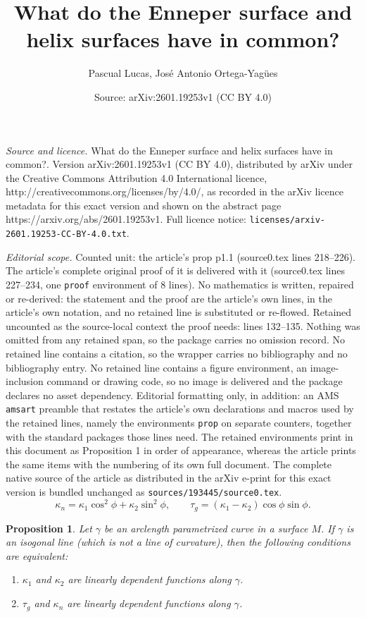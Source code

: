 \documentclass[10pt,a4paper]{amsart}
\title{What do the Enneper surface and helix surfaces have in common?}
\author{Pascual Lucas, Jos\'e Antonio Ortega-Yag\"ues}
\date{Source: arXiv:2601.19253v1 (CC BY 4.0)}
\newtheorem{prop}{Proposition}
\begin{document}
\maketitle

\noindent\emph{Source and licence.} What do the Enneper surface and helix surfaces have in common?. Version arXiv:2601.19253v1 (CC BY 4.0), distributed by arXiv under the Creative Commons Attribution 4.0 International licence, http://creativecommons.org/licenses/by/4.0/, as recorded in the arXiv licence metadata for this exact version and shown on the abstract page https://arxiv.org/abs/2601.19253v1. Full licence notice: \texttt{licenses/arxiv-2601.19253-CC-BY-4.0.txt}.\par\smallskip

\noindent\textit{Editorial scope.} Counted unit: the article's prop p1.1 (source0.tex lines 218--226). The article's complete original proof of it is delivered with it (source0.tex lines 227--234, one \texttt{proof} environment of 8 lines). No mathematics is written, repaired or re-derived: the statement and the proof are the article's own lines, in the article's own notation, and no retained line is substituted or re-flowed.  Retained uncounted as the source-local context the proof needs: lines 132--135.  Nothing was omitted from any retained span, so the package carries no omission record.  No retained line contains a citation, so the wrapper carries no bibliography and no bibliography entry.  No retained line contains a figure environment, an image-inclusion command or drawing code, so no image is delivered and the package declares no asset dependency.  Editorial formatting only, in addition: an AMS \texttt{amsart} preamble that restates the article's own declarations and macros used by the retained lines, namely the environments \texttt{prop} on separate counters, together with the standard packages those lines need.  The retained environments print in this document as Proposition 1 in order of appearance, whereas the article prints the same items with the numbering of its own full document.  The complete native source of the article as distributed in the arXiv e-print for this exact version is bundled unchanged as \texttt{sources/193445/source0.tex}.
\begin{equation}\label{kntg}
\kappa_n=\kappa_1\cos^2\phi+\kappa_2\sin^2\phi,\qquad
\tau_g=(\kappa_1-\kappa_2)\cos\phi\sin\phi.
\end{equation}

\begin{prop}\label{p1.1}%
Let $\gamma$ be an arclength parametrized curve in a surface $M$. If $\gamma$ is an isogonal line (which is not a line of curvature), then the following conditions are equivalent:\vspace*{-\topsep}
\begin{enumerate}\itemsep0pt
\item[C1)]
$\kappa_1$ and $\kappa_2$ are linearly dependent functions along $\gamma$.
\item[C2)]
$\tau_g$ and $\kappa_n$ are linearly dependent functions along $\gamma$.
\end{enumerate}
\end{prop}
\end{document}
